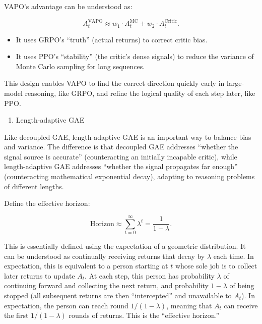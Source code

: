 VAPO's advantage can be understood as:

\[
A_t^{\mathrm{VAPO}}
\approx
w_1\cdot A_t^{\mathrm{MC}}
+
w_2\cdot A_t^{\mathrm{Critic}}.
\]

\begin{itemize}
\tightlist
\item
  It uses GRPO's ``truth'' (actual returns) to correct critic bias.
\item
  It uses PPO's ``stability'' (the critic's dense signals) to reduce the variance of Monte Carlo sampling for long sequences.
\end{itemize}

This design enables VAPO to find the correct direction quickly early in large-model reasoning, like GRPO, and refine the logical quality of each step later, like PPO.

\begin{enumerate}
\def\labelenumi{\arabic{enumi}.}
\setcounter{enumi}{2}
\tightlist
\item
  Length-adaptive GAE
\end{enumerate}

Like decoupled GAE, length-adaptive GAE is an important way to balance bias and variance. The difference is that decoupled GAE addresses ``whether the signal source is accurate'' (counteracting an initially incapable critic), while length-adaptive GAE addresses ``whether the signal propagates far enough'' (counteracting mathematical exponential decay), adapting to reasoning problems of different lengths.

Define the effective horizon:

\[
\mathrm{Horizon}
\approx
\sum_{t=0}^{\infty}\lambda^t
=
\frac{1}{1-\lambda}.
\]

This is essentially defined using the expectation of a geometric distribution. It can be understood as continually receiving returns that decay by \(\lambda\) each time. In expectation, this is equivalent to a person starting at \(t\) whose sole job is to collect later returns to update \(A_t\). At each step, this person has probability \(\lambda\) of continuing forward and collecting the next return, and probability \(1-\lambda\) of being stopped (all subsequent returns are then ``intercepted'' and unavailable to \(A_t\)). In expectation, the person can reach round \(1/(1-\lambda)\), meaning that \(A_t\) can receive the first \(1/(1-\lambda)\) rounds of returns. This is the ``effective horizon.''

